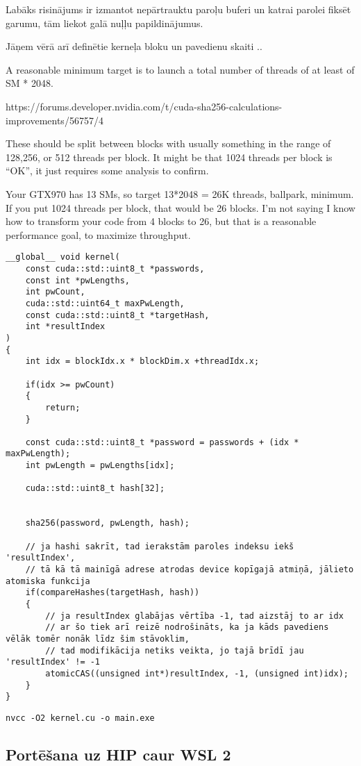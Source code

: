 \documentclass[12pt]{report}%
\theoremstyle{definition}
\begin{document}
Labāks risinājums ir izmantot nepārtrauktu paroļu buferi un katrai parolei fiksēt garumu, tām liekot galā 
nuļļu papildinājumus.


Jāņem vērā arī definētie kerneļa bloku un pavedienu skaiti ..

A reasonable minimum target is to launch a total number of threads of at least of SM * 2048.

https://forums.developer.nvidia.com/t/cuda-sha256-calculations-improvements/56757/4

These should be split between blocks with usually something in the range of 128,256, or 512 threads per block. It might be that 1024 threads per block is “OK”, it just requires some analysis to confirm.

Your GTX970 has 13 SMs, so target 13*2048 = 26K threads, ballpark, minimum. If you put 1024 threads per block, that would be 26 blocks. I’m not saying I know how to transform your code from 4 blocks to 26, but that is a reasonable performance goal, to maximize throughput.

\begin{lstlisting}
__global__ void kernel(
    const cuda::std::uint8_t *passwords,
    const int *pwLengths,
    int pwCount,
    cuda::std::uint64_t maxPwLength,
    const cuda::std::uint8_t *targetHash,
    int *resultIndex
)
{
    int idx = blockIdx.x * blockDim.x +threadIdx.x;

    if(idx >= pwCount)
    {
        return;
    }

    const cuda::std::uint8_t *password = passwords + (idx * maxPwLength);
    int pwLength = pwLengths[idx];

    cuda::std::uint8_t hash[32];


    sha256(password, pwLength, hash);

    // ja hashi sakrīt, tad ierakstām paroles indeksu iekš 'resultIndex',
    // tā kā tā mainīgā adrese atrodas device kopīgajā atmiņā, jālieto atomiska funkcija
    if(compareHashes(targetHash, hash))
    {
        // ja resultIndex glabājas vērtība -1, tad aizstāj to ar idx
        // ar šo tiek arī reizē nodrošināts, ka ja kāds pavediens vēlāk tomēr nonāk līdz šim stāvoklim,
        // tad modifikācija netiks veikta, jo tajā brīdī jau 'resultIndex' != -1
        atomicCAS((unsigned int*)resultIndex, -1, (unsigned int)idx);
    }
}
\end{lstlisting}


\texttt{nvcc -O2 kernel.cu -o main.exe}

\subsection{Portēšana uz HIP caur WSL 2}
\end{document}
